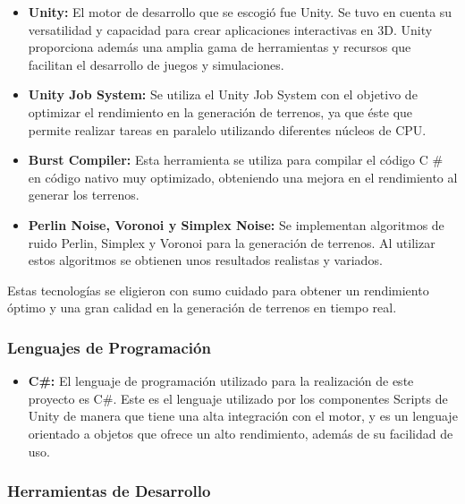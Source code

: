 \begin{itemize}
    \item \textbf{Unity:} El motor de desarrollo que se escogió fue Unity. Se tuvo en cuenta su versatilidad y capacidad para crear aplicaciones interactivas en 3D. Unity proporciona además una amplia gama de herramientas y recursos que facilitan el desarrollo de juegos y simulaciones.
    
    \item \textbf{Unity Job System:} Se utiliza el Unity Job System con el objetivo de optimizar el rendimiento en la generación de terrenos, ya que éste que permite realizar tareas en paralelo utilizando diferentes núcleos de CPU.
    
    \item \textbf{Burst Compiler:} Esta herramienta se utiliza para compilar el código C \# en código nativo muy optimizado, obteniendo una mejora en el rendimiento al generar los terrenos.
    
    \item \textbf{Perlin Noise, Voronoi y Simplex Noise:} Se implementan algoritmos de ruido Perlin, Simplex y Voronoi para la generación de terrenos. Al utilizar estos algoritmos se obtienen unos resultados realistas y variados.
    
\end{itemize}

Estas tecnologías se eligieron con sumo cuidado para obtener un rendimiento óptimo y una gran calidad en la generación de terrenos en tiempo real.

\subsubsection{Lenguajes de Programación}
\begin{itemize}
    \item \textbf{C\#:} El lenguaje de programación utilizado para la realización de este proyecto es C\#. Este es el lenguaje utilizado por los componentes Scripts de Unity de manera que tiene una alta integración con el motor, y es un lenguaje orientado a objetos que ofrece un alto rendimiento, además de su facilidad de uso.
    
\end{itemize}

\subsubsection{Herramientas de Desarrollo}

